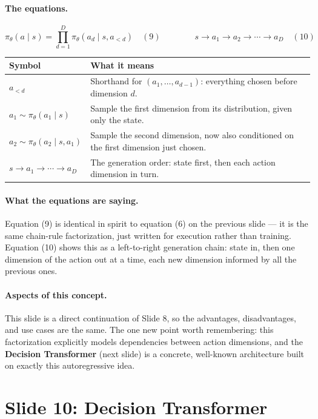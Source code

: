 \documentclass[11pt]{article}
\begin{document}
\paragraph{The equations.}
$$\pi_\theta(a\mid s) = \prod_{d=1}^D \pi_\theta(a_d \mid s, a_{<d}) \quad(9)
\qquad\qquad
s \to a_1 \to a_2 \to \cdots \to a_D \quad(10)$$

\begin{center}
\begin{tabular}{@{}p{3.2cm}p{10.3cm}@{}}
\toprule
Symbol & What it means \\
\midrule
$a_{<d}$ & Shorthand for $(a_1,\ldots,a_{d-1})$: everything chosen before dimension $d$. \\
$a_1 \sim \pi_\theta(a_1\mid s)$ & Sample the first dimension from its distribution,
given only the state. \\
$a_2 \sim \pi_\theta(a_2\mid s,a_1)$ & Sample the second dimension, now also conditioned
on the first dimension just chosen. \\
$s \to a_1 \to \cdots \to a_D$ & The generation order: state first, then each action
dimension in turn. \\
\bottomrule
\end{tabular}
\end{center}

\paragraph{What the equations are saying.}
Equation (9) is identical in spirit to equation (6) on the previous slide --- it is the
same chain-rule factorization, just written for execution rather than training.
Equation (10) shows this as a left-to-right generation chain: state in, then one
dimension of the action out at a time, each new dimension informed by all the previous
ones.

\paragraph{Aspects of this concept.}
This slide is a direct continuation of Slide 8, so the advantages, disadvantages, and
use cases are the same. The one new point worth remembering: this factorization
explicitly models dependencies between action dimensions, and the \textbf{Decision
Transformer} (next slide) is a concrete, well-known architecture built on exactly this
autoregressive idea.

\section{Slide 10: Decision Transformer}
\end{document}
